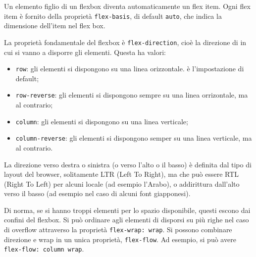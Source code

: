\documentclass[a4paper,11pt]{article}
\begin{document}
Un elemento figlio di un flexbox diventa automaticamente un flex item. 
Ogni flex item è fornito della proprietà \lstinline|flex-basis|, di default \lstinline|auto|, che indica la dimensione dell'item nel flex box.

La proprietà fondamentale del flexbox è \lstinline|flex-direction|, cioè la direzione di in cui si vanno a disporre gli elementi.
Questa ha valori:
\begin{itemize}
	\item \lstinline|row|: gli elementi si dispongono su una linea orizzontale. è l'impostazione di default;
	\item \lstinline|row-reverse|: gli elementi si dispongono sempre su una linea orrizontale, ma al contrario;
	\item \lstinline|column|: gli elementi si dispongono su una linea verticale;
	\item \lstinline|column-reverse|: gli elementi si dispongono semper su una linea verticale, ma al contrario.
\end{itemize}
La direzione verso destra o sinistra (o verso l'alto o il basso) è definita dal tipo di layout del browser, solitamente LTR (Left To Right), ma che può essere RTL (Right To Left) per alcuni locale (ad esempio l'Arabo), o addirittura dall'alto verso il basso (ad esempio nel caso di alcuni font giapponesi).

Di norma, se si hanno troppi elementi per lo spazio disponibile, questi escono dai confini del flexbox.
Si può ordinare agli elementi di disporsi su più righe nel caso di overflow attraverso la proprietà \lstinline|flex-wrap: wrap|. 
Si possono combinare direzione e wrap in un unica proprietà, \lstinline|flex-flow|.
Ad esempio, si può avere \lstinline|flex-flow: column wrap|.
\end{document}
